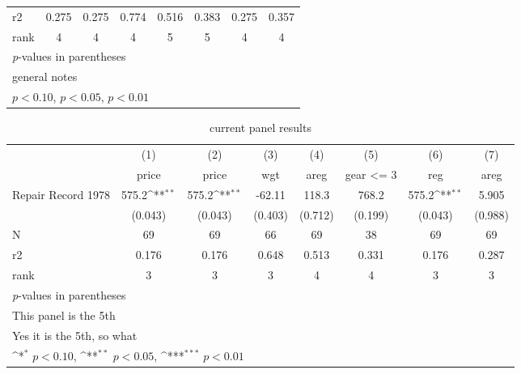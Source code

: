 \begin{table}[htbp]
\begin{tabular}{l*{7}{c}}
r2                  &       0.275         &       0.275         &       0.774         &       0.516         &       0.383         &       0.275         &       0.357         \\
rank                &           4         &           4         &           4         &           5         &           5         &           4         &           4         \\
\bottomrule
\multicolumn{8}{l}{\footnotesize \textit{p}-values in parentheses}\\
\multicolumn{8}{l}{\footnotesize general notes}\\
\multicolumn{8}{l}{\footnotesize \sym{*} \(p<0.10\), \sym{**} \(p<0.05\), \sym{***} \(p<0.01\)}\\
\end{tabular}
\end{table}
\begin{table}[htbp]\centering
\def\sym#1{\ifmmode^{#1}\else\(^{#1}\)\fi}
\caption{current panel results}
\begin{tabular}{l*{7}{c}}
\toprule
                    &\multicolumn{1}{c}{(1)}&\multicolumn{1}{c}{(2)}&\multicolumn{1}{c}{(3)}&\multicolumn{1}{c}{(4)}&\multicolumn{1}{c}{(5)}&\multicolumn{1}{c}{(6)}&\multicolumn{1}{c}{(7)}\\
                    &\multicolumn{1}{c}{price}&\multicolumn{1}{c}{price}&\multicolumn{1}{c}{wgt}&\multicolumn{1}{c}{areg}&\multicolumn{1}{c}{gear <= 3}&\multicolumn{1}{c}{reg}&\multicolumn{1}{c}{areg}\\
\midrule
Repair Record 1978  &       575.2\sym{**} &       575.2\sym{**} &      -62.11         &       118.3         &       768.2         &       575.2\sym{**} &       5.905         \\
                    &     (0.043)         &     (0.043)         &     (0.403)         &     (0.712)         &     (0.199)         &     (0.043)         &     (0.988)         \\
\midrule
N                   &          69         &          69         &          66         &          69         &          38         &          69         &          69         \\
r2                  &       0.176         &       0.176         &       0.648         &       0.513         &       0.331         &       0.176         &       0.287         \\
rank                &           3         &           3         &           3         &           4         &           4         &           3         &           3         \\
\bottomrule
\multicolumn{8}{l}{\footnotesize \textit{p}-values in parentheses}\\
\multicolumn{8}{l}{\footnotesize This panel is the 5th}\\
\multicolumn{8}{l}{\footnotesize Yes it is the 5th, so what}\\
\multicolumn{8}{l}{\footnotesize \sym{*} \(p<0.10\), \sym{**} \(p<0.05\), \sym{***} \(p<0.01\)}\\
\end{tabular}
\end{table}
